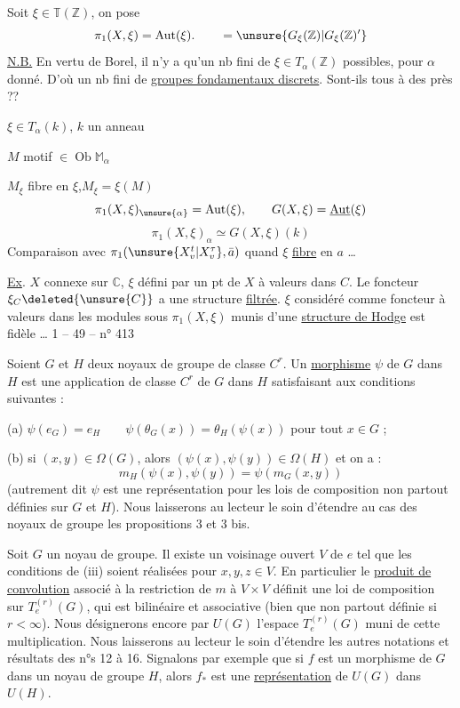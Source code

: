 Soit $\xi\in\mathbb T(\mathbb Z)$, on pose
\[
\pi_1(X,\xi)=\operatorname{Aut}(\xi).
\qquad =\unsure{G_\xi(\mathbb Z)|G_\xi(\mathbb Z)'}
\]
\uline{N.B.} En vertu de Borel, il n'y a qu'un
nb fini de $\xi\in T_\alpha(\mathbb Z)$ possibles, pour $\alpha$
donné. D'où un nb fini de \uline{groupes
fondamentaux discrets}. Sont-ils tous
 à des  près ??

$\xi\in T_\alpha(k)$, $k$ un anneau

$M$ motif $\in\operatorname{Ob}\mathbb M_\alpha$

$M_\xi$ fibre en $\xi$,\qquad $M_\xi=\xi(M)$
\[
\pi_1(X,\xi)_{\unsure{\alpha}}=\operatorname{Aut}(\xi),\qquad
G(X,\xi)=\underline{\operatorname{Aut}}(\xi)
\]
\[
\pi_1(X,\xi)_\alpha\simeq G(X,\xi)(k)
\]
Comparaison avec $\pi_1(\unsure{X^t_v|X^\tau_v},\bar a)$ quand $\xi$ 
\uline{fibre} en $a$ \ldots

\uline{Ex}. $X$ connexe sur $\mathbb C$, $\xi$ défini par un pt de
$X$ à valeurs dans $C$. Le foncteur $\xi_C\deleted{\unsure{C}}$ a une
structure \uline{filtrée}. $\xi$ considéré comme
foncteur à valeurs dans les modules
sous $\pi_1(X,\xi)$ munis d'une \uline{structure de
Hodge} est  fidèle \ldots
{}
1 -- 49 -- \hfill n° 413

Soient $G$ et $H$ deux noyaux de groupe de classe $C^r$. Un \uline{morphisme} $\psi$ de $G$
dans $H$ est une application de classe $C^r$ de $G$ dans $H$ satisfaisant aux conditions
suivantes :

(a) $\psi(e_G)=e_H\qquad \psi(\theta_G(x))=\theta_H(\psi(x))$ pour tout $x\in G$ ;

(b) si $(x,y)\in\Omega(G)$, alors $(\psi(x),\psi(y))\in\Omega(H)$ et on a :
\[
m_H(\psi(x),\psi(y))=\psi(m_G(x,y))
\]
(autrement dit $\psi$ est une représentation pour les lois de composition non partout
définies sur $G$ et $H$). Nous laisserons au lecteur le soin d'étendre au cas des
noyaux de groupe les propositions 3 et 3 bis.

Soit $G$ un noyau de groupe. Il existe un voisinage ouvert $V$ de $e$ tel que les
conditions de (iii) soient réalisées pour $x,y,z\in V$. En particulier le \uline{produit de
convolution} associé à la restriction de $m$ à $V\times V$ définit une loi de composition
sur $T_e^{(r)}(G)$, qui est bilinéaire et associative (bien que non partout définie
si $r<\infty$). Nous désignerons encore par $U(G)$ l'espace $T_e^{(r)}(G)$ muni de cette multiplication.
Nous laisserons au lecteur le soin d'étendre les autres notations et
résultats des n°s 12 à 16. Signalons par exemple que si $f$ est un morphisme de $G$
dans un noyau de groupe $H$, alors $f_*$ est une \uline{représentation} de $U(G)$ dans $U(H)$.

